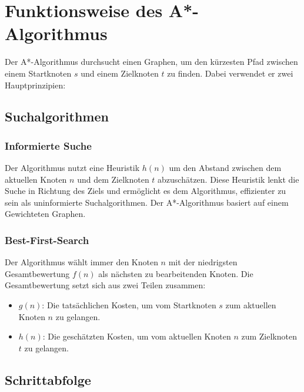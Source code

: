 \chapter{Funktionsweise des A*-Algorithmus}

Der A*-Algorithmus durchsucht einen Graphen, um den kürzesten Pfad zwischen einem Startknoten $s$ und einem Zielknoten $t$ zu finden. Dabei verwendet er zwei Hauptprinzipien:

\section{Suchalgorithmen}
\subsection{Informierte Suche}


Der Algorithmus nutzt eine Heuristik $h(n)$ um den Abstand zwischen dem aktuellen Knoten $n$ und dem Zielknoten $t$ abzuschätzen. Diese Heuristik lenkt die Suche in Richtung des Ziels und ermöglicht es dem Algorithmus, effizienter zu sein als uninformierte Suchalgorithmen. Der A*-Algorithmus basiert auf einem Gewichteten Graphen.

\subsection{Best-First-Search}

Der Algorithmus wählt immer den Knoten $n$ mit der niedrigsten Gesamtbewertung $f(n)$ als nächsten zu bearbeitenden Knoten. Die Gesamtbewertung setzt sich aus zwei Teilen zusammen:

\begin{itemize}
    \item $g(n)$: Die tatsächlichen Kosten, um vom Startknoten $s$ zum aktuellen Knoten $n$ zu gelangen.
    \item $h(n)$: Die geschätzten Kosten, um vom aktuellen Knoten $n$ zum Zielknoten $t$ zu gelangen.
\end{itemize}


\newpage
\section{Schrittabfolge}

